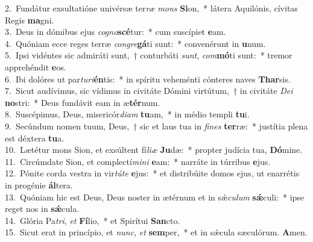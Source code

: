{2.~}Fundátur exsultatióne univérsæ ter\textit{ræ} \textit{mons} \textbf{Si}on,~* látera Aquilónis, cívitas Regis \textbf{ma}gni.\\
{3.~}Deus in dómibus ejus \textit{co}\textit{gno}\textbf{scé}tur:~* cum suscípiet \textbf{e}am.\\
{4.~}Quóniam ecce reges terræ \textit{con}\textit{gre}\textbf{gá}ti sunt:~* convenérunt in \textbf{u}num.\\
{5.~}Ipsi vidéntes sic admiráti sunt,~† conturbáti \textit{sunt}, \textit{com}\textbf{mó}ti sunt:~* tremor apprehéndit \textbf{e}os.\\
{6.~}Ibi dolóres ut par\textit{tu}\textit{ri}\textbf{én}tis:~* in spíritu veheménti cónteres naves \textbf{Thar}sis.\\
{7.~}Sicut audívimus, sic vídimus in civitáte Dómini virtútum,~† in civitáte \textit{De}\textit{i} \textbf{no}stri:~* Deus fundávit eam in æ\textbf{tér}num.\\
{8.~}Suscépimus, Deus, misericór\textit{di}\textit{am} \textbf{tu}am,~* in médio templi \textbf{tu}i.\\
{9.~}Secúndum nomen tuum, Deus,~† sic et laus tua in \textit{fi}\textit{nes} \textbf{ter}ræ:~* justítia plena est déxtera \textbf{tu}a.\\
{10.~}Lætétur mons Sion, et exsúltent fí\textit{li}\textit{æ} \textbf{Ju}dæ:~* propter judícia tua, \textbf{Dó}mine.\\
{11.~}Circúmdate Sion, et complectí\textit{mi}\textit{ni} \textbf{e}am:~* narráte in túrribus \textbf{e}jus.\\
{12.~}Pónite corda vestra in vir\textit{tú}\textit{te} \textbf{e}jus:~* et distribúite domos ejus, ut enarrétis in progénie \textbf{ál}tera.\\
{13.~}Quóniam hic est Deus, Deus noster in ætérnum et in sǽ\textit{cu}\textit{lum} \textbf{sǽ}culi:~* ipse reget nos in \textbf{sǽ}cula.\\
{14.~}Glória Pa\textit{tri}, \textit{et} \textbf{Fí}lio,~* et Spirítui \textbf{San}cto.\\
{15.~}Sicut erat in princípio, et \textit{nunc}, \textit{et} \textbf{sem}per,~* et in sǽcula sæculórum. \textbf{A}men.\\
